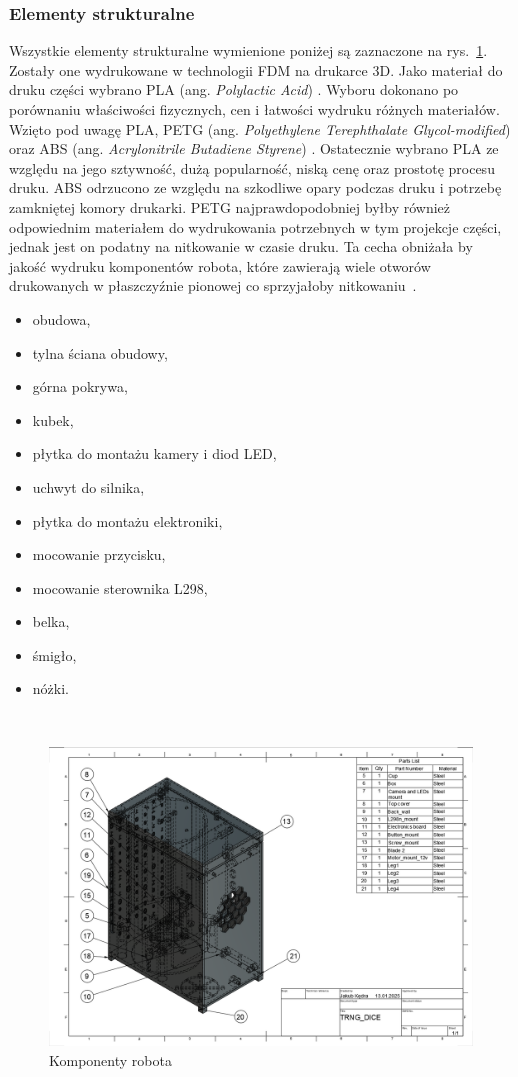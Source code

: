 \subsubsection{Elementy strukturalne}
Wszystkie elementy strukturalne wymienione poniżej są zaznaczone na rys.~\ref{fig:komponenty}. Zostały one wydrukowane w technologii FDM na drukarce 3D. Jako materiał do druku części wybrano
PLA (ang. \textit{Polylactic Acid}) \cite{plaprusa}. Wyboru dokonano po porównaniu właściwości fizycznych, cen i łatwości wydruku różnych materiałów. Wzięto pod uwagę
PLA, PETG (ang. \textit{Polyethylene Terephthalate Glycol-modified}) \cite{PETG} oraz ABS (ang. \textit{Acrylonitrile Butadiene Styrene}) \cite{ABS}. Ostatecznie wybrano PLA ze względu na jego sztywność, dużą popularność,
niską cenę oraz prostotę procesu druku. ABS odrzucono ze względu na szkodliwe opary podczas druku i potrzebę zamkniętej komory drukarki. PETG najprawdopodobniej
byłby również odpowiednim materiałem do wydrukowania potrzebnych w tym projekcje części, jednak jest on podatny na nitkowanie w czasie druku. Ta cecha
obniżała by jakość wydruku komponentów robota, które zawierają wiele otworów drukowanych w płaszczyźnie pionowej co sprzyjałoby nitkowaniu~\cite{PLA, PLA2}.
    \begin{itemize}
        \item obudowa,
        \item tylna ściana obudowy,
        \item górna pokrywa,
        \item kubek,
        \item płytka do montażu kamery i diod LED,
        \item uchwyt do silnika,
        \item płytka do montażu elektroniki,
        \item mocowanie przycisku,
        \item mocowanie sterownika L298,
        \item belka,
        \item śmigło,
        \item nóżki.
    \end{itemize}\
    \begin{figure}[H]
        \centering
        \includegraphics[width=0.95\linewidth]{chapters/03-praca-wlasna/figures/komponenty}
        \caption{\label{fig:komponenty}Komponenty robota}
    \end{figure}

